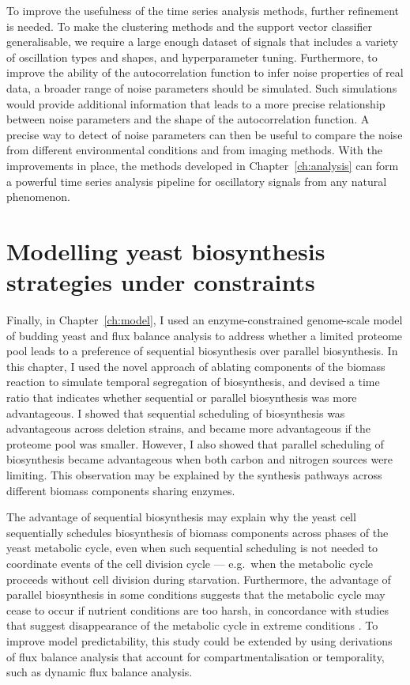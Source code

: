 To improve the usefulness of the time series analysis methods, further refinement is needed.
To make the clustering methods and the support vector classifier generalisable, we require a large enough dataset of signals that includes a variety of oscillation types and shapes, and hyperparameter tuning.
Furthermore, to improve the ability of the autocorrelation function to infer noise properties of real data, a broader range of noise parameters should be simulated.
Such simulations would provide additional information that leads to a more precise relationship between noise parameters and the shape of the autocorrelation function.
A precise way to detect of noise parameters can then be useful to compare the noise from different environmental conditions and from imaging methods.
With the improvements in place, the methods developed in Chapter~\ref{ch:analysis} can form a powerful time series analysis pipeline for oscillatory signals from any natural phenomenon.


\section{Modelling yeast biosynthesis strategies under constraints}
\label{sec:concl-model}

Finally, in Chapter~\ref{ch:model}, I used an enzyme-constrained genome-scale model of budding yeast and flux balance analysis to address whether a limited proteome pool leads to a preference of sequential biosynthesis over parallel biosynthesis.
In this chapter, I used the novel approach of ablating components of the biomass reaction to simulate temporal segregation of biosynthesis, and devised a time ratio that indicates whether sequential or parallel biosynthesis was more advantageous.
I showed that sequential scheduling of biosynthesis was advantageous across deletion strains, and became more advantageous if the proteome pool was smaller.
However, I also showed that parallel scheduling of biosynthesis became advantageous when both carbon and nitrogen sources were limiting.
This observation may be explained by the synthesis pathways across different biomass components sharing enzymes.

The advantage of sequential biosynthesis may explain why the yeast cell sequentially schedules biosynthesis of biomass components across phases of the yeast metabolic cycle, even when such sequential scheduling is not needed to coordinate events of the cell division cycle --- e.g.\ when the metabolic cycle proceeds without cell division during starvation.
Furthermore, the advantage of parallel biosynthesis in some conditions suggests that the metabolic cycle may cease to occur if nutrient conditions are too harsh, in concordance with studies that suggest disappearance of the metabolic cycle in extreme conditions \parencite{oneillEukaryoticCellBiology2020}.
To improve model predictability, this study could be extended by using derivations of flux balance analysis that account for compartmentalisation or temporality, such as dynamic flux balance analysis.


